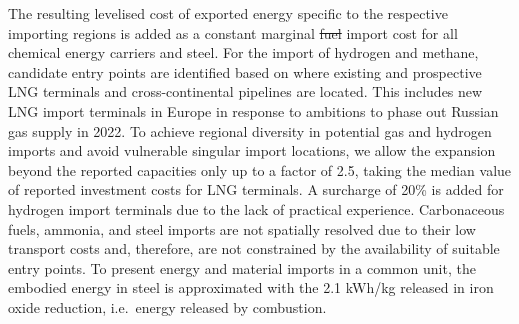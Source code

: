 \documentclass[5p,9pt,draft]{elsarticle}
\providecommand{\DIFdeltex}[1]{{\protect\color{red}\sout{#1}}}                      %
\providecommand{\DIFdelbegin}{} %
\providecommand{\DIFdelend}{} %
\providecommand{\DIFdel}[1]{\texorpdfstring{\DIFdeltex{#1}}{}} %
\newcommand{\DIFscaledelfig}{0.5}
\newlength{\DIFdelgraphicswidth} %
\newlength{\DIFdelgraphicsheight} %
\newcommand{\DIFdelincludegraphics}[2][]{%
\sbox{\DIFdelgraphicsbox}{\DIFOincludegraphics[#1]{#2}}%
\settoboxwidth{\DIFdelgraphicswidth}{\DIFdelgraphicsbox} %
\settoboxtotalheight{\DIFdelgraphicsheight}{\DIFdelgraphicsbox} %
\scalebox{\DIFscaledelfig}{%
\parbox[b]{\DIFdelgraphicswidth}{\usebox{\DIFdelgraphicsbox}\\[-\baselineskip] \rule{\DIFdelgraphicswidth}{0em}}\llap{\resizebox{\DIFdelgraphicswidth}{\DIFdelgraphicsheight}{%
\setlength{\unitlength}{\DIFdelgraphicswidth}%
\begin{picture}(1,1)%
\thicklines\linethickness{2pt} %
{\color[rgb]{1,0,0}\put(0,0){\framebox(1,1){}}}%
{\color[rgb]{1,0,0}\put(0,0){\line( 1,1){1}}}%
{\color[rgb]{1,0,0}\put(0,1){\line(1,-1){1}}}%
\end{picture}%
}\hspace*{3pt}}} %
} %
\DeclareRobustCommand{\DIFdelbegin}{\DIFOdelbegin \let\includegraphics\DIFdelincludegraphics} %
\DeclareRobustCommand{\DIFdelend}{\DIFOaddend \let\includegraphics\DIFOincludegraphics} %
\begin{document}

The resulting levelised cost of exported energy specific to the respective
importing regions is added as a constant marginal \DIFdelbegin \DIFdel{fuel }\DIFdelend import cost for all
chemical energy carriers and steel. For the import of hydrogen and methane,
candidate entry points are identified based on where existing and prospective
LNG terminals and cross-continental pipelines are located. This includes new LNG
import terminals in Europe in response to ambitions to phase out Russian gas
supply in 2022.
\cite{instituteforenergyeconomicsandfinancialanalysisEuropeanLNG2023} To achieve
regional diversity in potential gas and hydrogen imports and avoid vulnerable
singular import locations, we allow the expansion beyond the reported capacities
only up to a factor of 2.5, taking the median value of reported investment costs
for LNG terminals.\cite{GlobalGas2022} A surcharge of 20\% is added for hydrogen
import terminals due to the lack of practical experience. Carbonaceous fuels,
ammonia, and steel imports are not spatially resolved due to their low transport
costs and, therefore, are not constrained by the availability of suitable entry
points. To present energy and material imports in a common unit, the embodied
energy in steel is approximated with the 2.1 kWh/kg released in iron oxide
reduction, i.e.~energy released by combustion.\cite{kuhnIronRecyclable2022}

\end{document}
